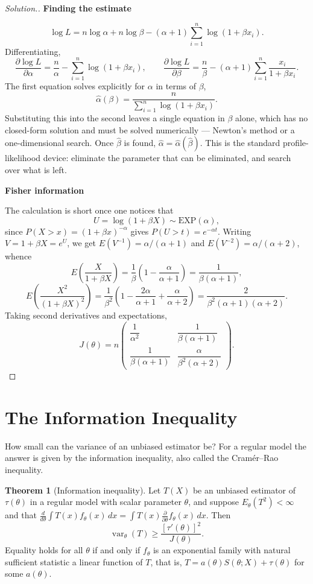 \documentclass[12pt,a4paper]{report}
\theoremstyle{definition}
\newtheorem{thm}{Theorem}[section]
\newcommand{\subhead}[1]{%
  \par\medskip\noindent\textbf{#1}\par\nobreak\smallskip}
\DeclareMathOperator{\var}{var}
\newenvironment{solution}
  {\renewcommand{\qedsymbol}{}\begin{proof}[\textit{Solution}.]}
  {\end{proof}}
\begin{document}
\begin{solution}
\subhead{Finding the estimate}
\[\log L = n\log\alpha + n\log\beta - (\alpha+1)\sum_{i=1}^{n}\log\left(1+\beta x_i\right).\]
Differentiating,
\[\frac{\partial \log L}{\partial\alpha} = \frac{n}{\alpha} - \sum_{i=1}^{n}\log\left(1+\beta x_i\right),
\qquad
\frac{\partial \log L}{\partial\beta} = \frac{n}{\beta} - (\alpha+1)\sum_{i=1}^{n}\frac{x_i}{1+\beta x_i}.\]
The first equation solves explicitly for $\alpha$ in terms of $\beta$,
\[\widehat{\alpha}(\beta) = \frac{n}{\sum_{i=1}^{n}\log\left(1+\beta x_i\right)} .\]
Substituting this into the second leaves a single equation in $\beta$ alone,
which has no closed-form solution and must be solved numerically --- Newton's
method or a one-dimensional search. Once $\widehat{\beta}$ is found,
$\widehat{\alpha}=\widehat{\alpha}(\widehat{\beta})$. This is the standard
profile-likelihood device: eliminate the parameter that can be eliminated, and
search over what is left.

\subhead{Fisher information}
The calculation is short once one notices that
\[U = \log\left(1+\beta X\right) \sim \text{EXP}(\alpha),\]
since $P(X>x) = (1+\beta x)^{-\alpha}$ gives $P(U>t)=e^{-\alpha t}$. Writing
$V=1+\beta X=e^{U}$, we get $E\left(V^{-1}\right)=\alpha/(\alpha+1)$ and
$E\left(V^{-2}\right)=\alpha/(\alpha+2)$, whence
\[E\left(\frac{X}{1+\beta X}\right) = \frac{1}{\beta}\left(1-\frac{\alpha}{\alpha+1}\right) = \frac{1}{\beta(\alpha+1)},\]
\[E\left(\frac{X^{2}}{\left(1+\beta X\right)^{2}}\right)
= \frac{1}{\beta^{2}}\left(1 - \frac{2\alpha}{\alpha+1} + \frac{\alpha}{\alpha+2}\right)
= \frac{2}{\beta^{2}(\alpha+1)(\alpha+2)} .\]
Taking second derivatives and expectations,
\[J(\theta) = n\begin{pmatrix}
\dfrac{1}{\alpha^{2}} & \dfrac{1}{\beta(\alpha+1)}\\[8pt]
\dfrac{1}{\beta(\alpha+1)} & \dfrac{\alpha}{\beta^{2}(\alpha+2)}
\end{pmatrix}.\]
\end{solution}

\section{The Information Inequality}
\label{sec:crlb}

How small can the variance of an unbiased estimator be? For a regular model the
answer is given by the information inequality, also called the Cram\'er--Rao
inequality.

\begin{thm}[Information inequality]
\label{thm:crlb}
Let $T(X)$ be an unbiased estimator of $\tau(\theta)$ in a regular model with
scalar parameter $\theta$, and suppose $E_\theta(T^2)<\infty$ and that
$\frac{d}{d\theta}\int T(x)f_\theta(x)\,dx = \int T(x)\frac{\partial}{\partial\theta}f_\theta(x)\,dx$.
Then
\[\var_\theta(T)\ge\frac{\left[\tau'(\theta)\right]^2}{J(\theta)} .\]
Equality holds for all $\theta$ if and only if $f_\theta$ is an exponential family
with natural sufficient statistic a linear function of $T$, that is,
$T = a(\theta)S(\theta; X) + \tau(\theta)$ for some $a(\theta)$.
\end{thm}
\end{document}
